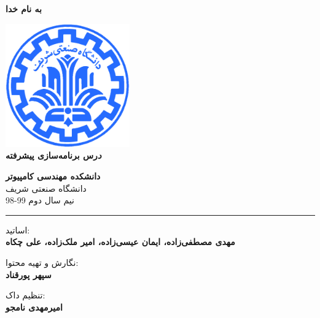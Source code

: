 \documentclass[]{article}
\begin{document}
\begin{titlepage}
\begin{center}

\textbf{ \Huge{به نام خدا} }
        
\vspace{0.2cm}

\includegraphics[width=0.4\textwidth]{sharif1.png}\\
\vspace{0.2cm}
\textbf{ \Huge{\emph درس برنامه‌سازی پیشرفته} }\\
\vspace{0.25cm}
\textbf{ \Large{} }
\vspace{0.2cm}
       
 
      \large \textbf{دانشکده مهندسی کامپیوتر}\\\vspace{0.1cm}
    \large   دانشگاه صنعتی شریف\\\vspace{0.2cm}
       \large   ﻧﯿﻢ سال دوم 99-98 \\\vspace{0.10cm}
      \noindent\rule[1ex]{\linewidth}{1pt}
اساتید:\\
    \textbf{{مهدی مصطفی‌زاده، ایمان عیسی‌زاده، امیر ملک‌زاده، علی چکاه}}



        \vspace{0.10cm}
نگارش و تهیه محتوا:\\
    \textbf{{سپهر پورقناد}}
    
       \vspace{0.10cm}
       تنظیم داک:\\
    \textbf{{امیرمهدی نامجو}}

    
        \vspace{0.05cm}

\end{center}
\end{titlepage}
\end{document}
